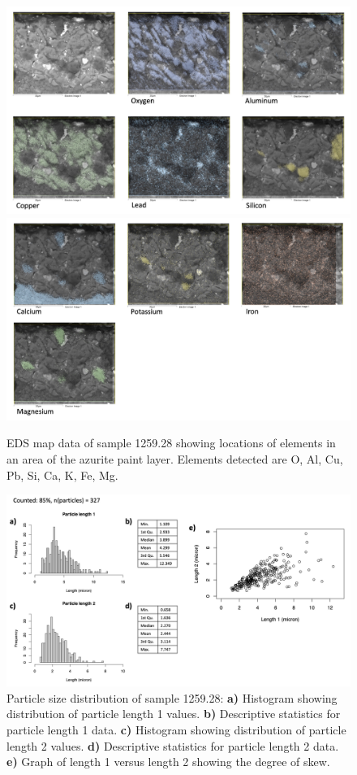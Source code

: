 \begin{figure}[H]
\centering
\begin{minipage}[t]{\linewidth}
  \centering
  \includegraphics[width=0.9\linewidth]{1259.28_mapdata_1}
\hfill
\includegraphics[width=0.9\linewidth]{1259.28_mapdata_2}
\hfill
\end{minipage}
\caption[EDS map data, sample 1259.28.]{EDS map data of sample 1259.28 showing locations of elements in an area of the azurite paint layer. Elements detected are O, Al, Cu, Pb, Si, Ca, K, Fe, Mg.}
\label{fig:1259.28_mapdata}
\end{figure}

\begin{figure}[H]
\centering
  \includegraphics[width=0.8\linewidth]{1259.28_partsize}
\caption[Particle size distribution, sample 1259.28.]{Particle size distribution of sample 1259.28: \textbf{a)} Histogram showing distribution of particle length 1 values. \textbf{b)} Descriptive statistics for particle length 1 data. \textbf{c)} Histogram showing distribution of particle length 2 values. \textbf{d)} Descriptive statistics for particle length 2 data. \textbf{e)} Graph of length 1 versus length 2 showing the degree of skew.}
\label{fig:1259.28_partsize}
\end{figure}


